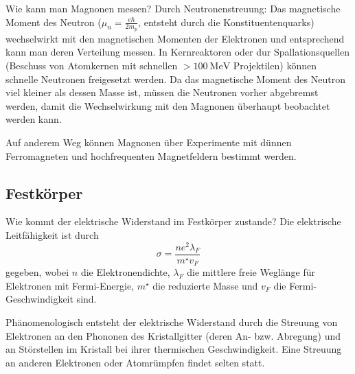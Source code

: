 
    

\begin{fquestion}{Wie kann man Magnonen messen?}
    Durch Neutronenstreuung: Das magnetische Moment des Neutron ($\mu_n = \frac{e \hbar}{2 m_p}$, entsteht durch die Konstituentenquarks) wechselwirkt mit den magnetischen Momenten der Elektronen und entsprechend kann man deren Verteilung messen.
    In Kernreaktoren oder dur Spallationsquellen (Beschuss von Atomkernen mit schnellen $> \SI{100}{\mega\electronvolt}$ Projektilen) können schnelle Neutronen freigesetzt werden.
    Da das magnetische Moment des Neutron viel kleiner als dessen Masse ist, müssen die Neutronen vorher abgebremst werden, damit die Wechselwirkung mit den Magnonen überhaupt beobachtet werden kann.
    
    Auf anderem Weg können Magnonen über Experimente mit dünnen Ferromagneten und hochfrequenten Magnetfeldern bestimmt werden.
\end{fquestion}



\subsection{Festkörper}

\begin{fquestion}{Wie kommt der elektrische Widerstand im Festkörper zustande?}
    Die elektrische Leitfähigkeit ist durch
    $$\sigma = \frac{n e^2 \lambda_F}{m^\star v_F}$$
    gegeben, wobei $n$ die Elektronendichte, $\lambda_F$ die mittlere freie Weglänge für Elektronen mit Fermi-Energie, $m^\star$ die reduzierte Masse und $v_F$ die Fermi-Geschwindigkeit sind.
    
    Phänomenologisch entsteht der elektrische Widerstand durch die Streuung von Elektronen an den Phononen des Kristallgitter (deren An- bzw. Abregung) und an Störstellen im Kristall bei ihrer thermischen Geschwindigkeit.
    Eine Streuung an anderen Elektronen oder Atomrümpfen findet selten statt.
\end{fquestion}


